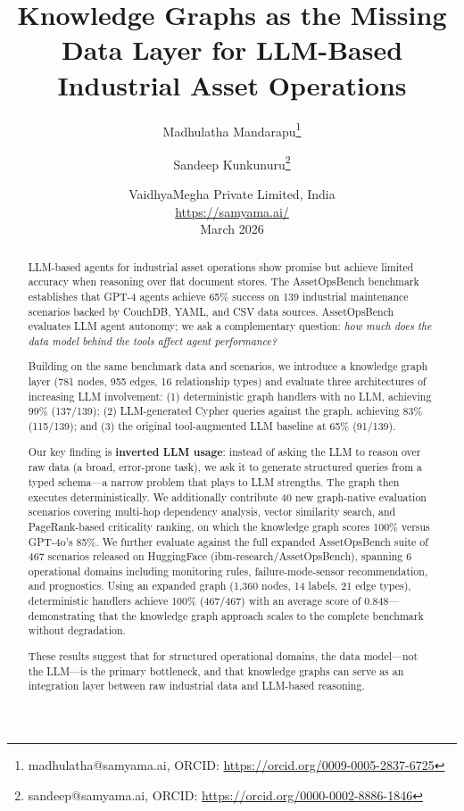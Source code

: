 \documentclass[11pt]{article}
\title{Knowledge Graphs as the Missing Data Layer for LLM-Based\\Industrial Asset Operations}
\author{
  Madhulatha Mandarapu\thanks{madhulatha@samyama.ai, ORCID: \url{https://orcid.org/0009-0005-2837-6725}} \and
  Sandeep Kunkunuru\thanks{sandeep@samyama.ai, ORCID: \url{https://orcid.org/0000-0002-8886-1846}}
}
\date{%
  VaidhyaMegha Private Limited, India\\[2pt]
  \url{https://samyama.ai/}\\[8pt]
  March 2026
}
\begin{document}
\maketitle

\begin{abstract}
LLM-based agents for industrial asset operations show promise but achieve limited accuracy when reasoning over flat document stores. The AssetOpsBench benchmark~\citep{ibm2025assetopsbench} establishes that GPT-4 agents achieve 65\% success on 139 industrial maintenance scenarios backed by CouchDB, YAML, and CSV data sources. AssetOpsBench evaluates LLM agent autonomy; we ask a complementary question: \emph{how much does the data model behind the tools affect agent performance?}

Building on the same benchmark data and scenarios, we introduce a knowledge graph layer (781 nodes, 955 edges, 16 relationship types) and evaluate three architectures of increasing LLM involvement: (1) deterministic graph handlers with no LLM, achieving 99\% (137/139); (2) LLM-generated Cypher queries against the graph, achieving 83\% (115/139); and (3) the original tool-augmented LLM baseline at 65\% (91/139).

Our key finding is \textbf{inverted LLM usage}: instead of asking the LLM to reason over raw data (a broad, error-prone task), we ask it to generate structured queries from a typed schema---a narrow problem that plays to LLM strengths. The graph then executes deterministically. We additionally contribute 40 new graph-native evaluation scenarios covering multi-hop dependency analysis, vector similarity search, and PageRank-based criticality ranking, on which the knowledge graph scores 100\% versus GPT-4o's 85\%.
We further evaluate against the full expanded AssetOpsBench suite of 467 scenarios released on HuggingFace (ibm-research/AssetOpsBench), spanning 6 operational domains including monitoring rules, failure-mode-sensor recommendation, and prognostics. Using an expanded graph (1{,}360 nodes, 14 labels, 21 edge types), deterministic handlers achieve 100\% (467/467) with an average score of 0.848---demonstrating that the knowledge graph approach scales to the complete benchmark without degradation.

These results suggest that for structured operational domains, the data model---not the LLM---is the primary bottleneck, and that knowledge graphs can serve as an integration layer between raw industrial data and LLM-based reasoning.
\end{abstract}
\end{document}
